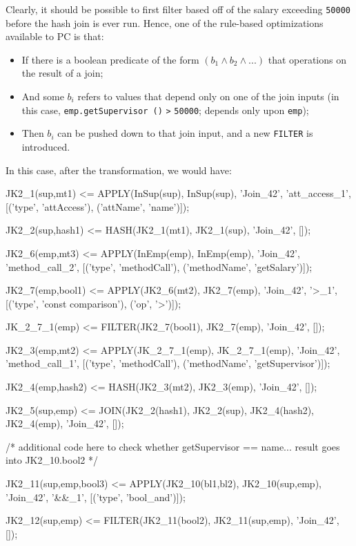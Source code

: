 Clearly, it should be possible to first filter based off of the salary exceeding \texttt{50000} before the hash join is ever run.  Hence, one of
the rule-based optimizations available to PC is that:

\begin{itemize}

\vspace{-5 pt}
\item If there is a boolean predicate of the form $(b_1 \wedge b_2 \wedge ...)$ that operations
on the result of a join;

\vspace{-5 pt}
\item And some $b_i$ refers to values that depend only on one of the join inputs (in this case, \texttt{emp.getSupervisor ()}
\texttt{>} \texttt{50000};
depends only upon \texttt{emp});

\vspace{-5 pt}
\item Then $b_i$ can be pushed down to that join input, and a new
  \texttt{FILTER} is introduced.
\end{itemize}

\noindent In this case, after the transformation, we would have:

\begin{codesmall}
JK2_1(sup,mt1) <= APPLY(InSup(sup), InSup(sup), 'Join_42', 'att_access_1', 
  [('type', 'attAccess'), ('attName', 'name')]);

JK2_2(sup,hash1) <= HASH(JK2_1(mt1), JK2_1(sup), 'Join_42', []);

JK2_6(emp,mt3) <= APPLY(InEmp(emp), InEmp(emp), 'Join_42', 'method_call_2', 
  [('type', 'methodCall'), ('methodName', 'getSalary')]);

JK2_7(emp,bool1) <= APPLY(JK2_6(mt2), JK2_7(emp), 'Join_42', '>_1', 
  [('type', 'const comparison'), ('op', '>')]);

JK_2_7_1(emp) <= FILTER(JK2_7(bool1), JK2_7(emp), 'Join_42', []);

JK2_3(emp,mt2) <= APPLY(JK_2_7_1(emp), JK_2_7_1(emp), 'Join_42', 'method_call_1', 
  [('type', 'methodCall'), ('methodName', 'getSupervisor')]);

JK2_4(emp,hash2) <= HASH(JK2_3(mt2), JK2_3(emp), 'Join_42', []);

JK2_5(sup,emp) <= JOIN(JK2_2(hash1), JK2_2(sup), JK2_4(hash2), 
  JK2_4(emp), 'Join_42', []);

/* additional code here to check whether getSupervisor == name... 
   result goes into JK2_10.bool2 */

JK2_11(sup,emp,bool3) <= APPLY(JK2_10(bl1,bl2), JK2_10(sup,emp), 'Join_42', '&&_1', 
  [('type', 'bool_and')]);

JK2_12(sup,emp) <= FILTER(JK2_11(bool2), JK2_11(sup,emp), 'Join_42', []);
\end{codesmall}
